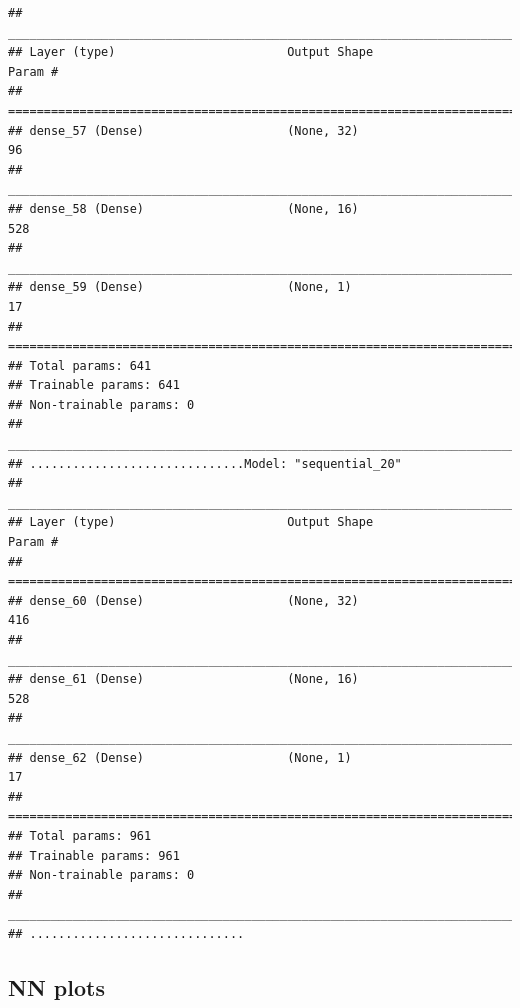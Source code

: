 \documentclass[
]{article}
\newenvironment{Shaded}{\begin{snugshade}}{\end{snugshade}}
\newcommand{\NormalTok}[1]{#1}
\newcommand{\OperatorTok}[1]{\textcolor[rgb]{0.81,0.36,0.00}{\textbf{#1}}}
\newcommand{\StringTok}[1]{\textcolor[rgb]{0.31,0.60,0.02}{#1}}
\begin{document}
\begin{verbatim}
## ________________________________________________________________________________
## Layer (type)                        Output Shape                    Param #     
## ================================================================================
## dense_57 (Dense)                    (None, 32)                      96          
## ________________________________________________________________________________
## dense_58 (Dense)                    (None, 16)                      528         
## ________________________________________________________________________________
## dense_59 (Dense)                    (None, 1)                       17          
## ================================================================================
## Total params: 641
## Trainable params: 641
## Non-trainable params: 0
## ________________________________________________________________________________
## ..............................Model: "sequential_20"
## ________________________________________________________________________________
## Layer (type)                        Output Shape                    Param #     
## ================================================================================
## dense_60 (Dense)                    (None, 32)                      416         
## ________________________________________________________________________________
## dense_61 (Dense)                    (None, 16)                      528         
## ________________________________________________________________________________
## dense_62 (Dense)                    (None, 1)                       17          
## ================================================================================
## Total params: 961
## Trainable params: 961
## Non-trainable params: 0
## ________________________________________________________________________________
## ..............................
\end{verbatim}

\begin{Shaded}
\end{Shaded}

\hypertarget{nn-plots}{%
\subsection{NN plots}\label{nn-plots}}
\end{document}
